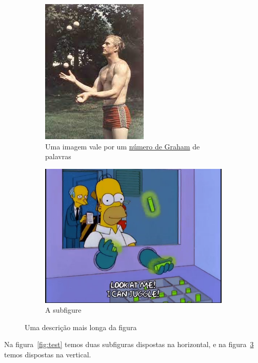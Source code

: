 \documentclass[10pt]{article}
\begin{document}
\begin{figure}[H]
\centering
\begin{subfigure}{.3\textwidth}
  \centering
  \includegraphics[width=.5\linewidth]{ron_graham_juggling.jpeg}
  \caption{Uma imagem vale por um \href{https://www.youtube.com/watch?v=XTeJ64KD5cg}{número de Graham} de palavras}
  \label{fig:sub1}
\end{subfigure}%

\begin{subfigure}{.5\textwidth}
  \centering
  \includegraphics[width=.8\linewidth]{homer_juggling.png}
  \caption{A subfigure}
\label{fig:sub2}
\end{subfigure}
\caption[A figure with two subfigures vertically]{Uma descrição mais longa da figura}
\label{fig:test_vertical}
\end{figure}


Na figura~\ref{fig:test} temos duas subfiguras dispostas na horizontal, e na figura~\ref{fig:test_vertical} temos dispostas na vertical.
\end{document}
